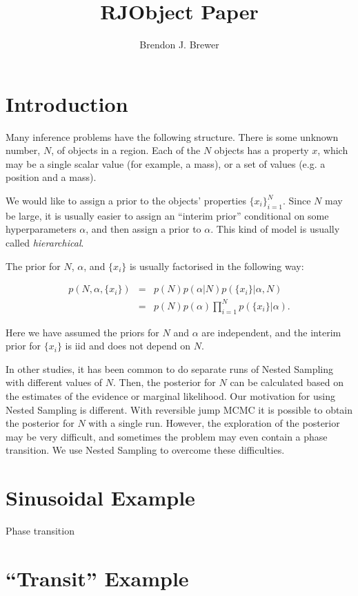 \documentclass[letterpaper, 11pt]{article}
\title{RJObject Paper}
\author{Brendon J. Brewer}
\begin{document}
\maketitle
{}

\section{Introduction}
Many inference problems have the following structure. There is some unknown
number, $N$, of objects in a region. Each of the $N$ objects has a property
$x$, which may be a single scalar value (for example, a mass), or a set of
values (e.g. a position and a mass).

We would like to assign a prior to the objects' properties $\{x_i\}_{i=1}^N$.
Since $N$ may be large, it is usually easier to assign an ``interim prior''
conditional on some hyperparameters $\alpha$, and then assign a prior to
$\alpha$. This kind of model is usually called {\it hierarchical}.

The prior for $N$, $\alpha$, and $\{x_i\}$ is usually factorised
in the following way:

\begin{eqnarray}
p(N, \alpha, \{x_i\}) &=& p(N) p(\alpha | N) p(\{x_i\} | \alpha, N) \\
&=& p(N) p(\alpha) \prod_{i=1}^N p(\{x_i\} | \alpha).
\end{eqnarray}

Here we have assumed the priors for $N$ and $\alpha$ are independent, and
the interim prior for $\{x_i\}$ is iid and does not depend on $N$.


In other studies, it has been common to do separate runs of Nested Sampling
with different values of $N$. Then, the posterior for $N$ can be calculated
based on the estimates of the evidence or marginal likelihood. Our motivation
for using Nested Sampling is different. With reversible jump MCMC it is possible
to obtain the posterior for $N$ with a single run. However, the exploration
of the posterior may be very difficult, and sometimes the problem may even
contain a phase transition. We use Nested Sampling to overcome these
difficulties.


\section{Sinusoidal Example}
Phase transition


\section{``Transit'' Example}
\end{document}
